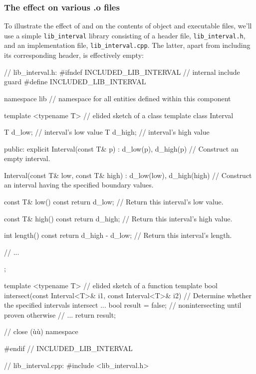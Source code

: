\subsubsection[The effect on various \lstinline!.o! files]{The effect on various {\SubsubsecCode .o} files}\label{the-effect-on-various-.o-files}

To illustrate the effect of  and  on the contents of object and executable files,
we'll use a simple \lstinline!lib_interval! library 
consisting of a header file, \lstinline!lib_interval.h!, and an
implementation file, \lstinline!lib_interval.cpp!. The latter, apart from
including its corresponding header, is effectively empty:

\begin{emcppslisting}[emcppsbatch=e2]
// lib_interval.h:
#ifndef INCLUDED_LIB_INTERVAL  // internal include guard
#define INCLUDED_LIB_INTERVAL

namespace lib  // namespace for all entities defined within this component
{

template <typename T>  // elided sketch of a class template
class Interval
{
    T d_low;   // interval's low value
    T d_high;  // interval's high value

public:
    explicit Interval(const T& p) : d_low(p), d_high(p) { }
        // Construct an empty interval.

    Interval(const T& low, const T& high) : d_low(low), d_high(high) { }
        // Construct an interval having the specified boundary values.

    const T& low() const { return d_low; }
        // Return this interval's low value.

    const T& high() const { return d_high; }
        // Return this interval's high value.

    int length() const { return d_high - d_low; }
        // Return this interval's length.

    // ...
};

template <typename T>                   // elided sketch of a function template
bool intersect(const Interval<T>& i1, const Interval<T>& i2)
    // Determine whether the specified intervals intersect ...
{
    bool result = false;  // nonintersecting until proven otherwise
    // ...
    return result;
}

}  // close (ù{}ù) namespace

#endif  // INCLUDED_LIB_INTERVAL
\end{emcppslisting}
\vspace*{2ex}   %
\begin{emcppslisting}[emcppsbatch=e2]
// lib_interval.cpp:
#include <lib_interval.h>
\end{emcppslisting}

